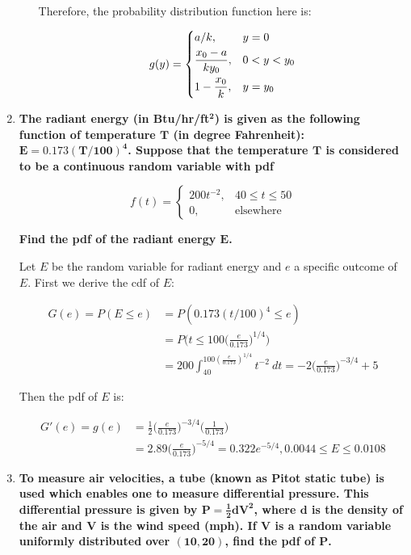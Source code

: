 \documentclass[10pt, oneside]{article}   	%
\theoremstyle{definition}
\begin{document}
\begin{enumerate}[label=5.\arabic*]
\begin{enumerate}
	Therefore, the probability distribution function here is:
	
	\[ g(y) = \begin{dcases} a/k, & y = 0 \\
	\frac{x_0 - a}{ky_0}, & 0 < y < y_0 \\
	1 - \frac{x_0}{k}, & y = y_0
	\end{dcases}
	\]
	\end{enumerate}

\item  \begin{tcolorbox}[
  colback=Cerulean!5!white,
  colframe=Cerulean!75!black]
\textbf{The radiant energy (in Btu/hr/ft$\bm{^2}$) is given as the following function of temperature $\bm{T}$ (in degree Fahrenheit): $\bm{E = 0.173 (T / 100)^4}$. Suppose that the temperature $\bm{T}$ is considered to be a continuous random variable with pdf}

\[ f(t) = \begin{cases}  200t^{-2}, & 40 \leq t \leq 50 \\
0, & \text{elsewhere} 
\end{cases} \]

\textbf{Find the pdf of the radiant energy $\bm{E}$.}
\end{tcolorbox}

Let $E$ be the random variable for radiant energy and $e$ a specific outcome of $E$. First we derive the cdf of $E$:

\begin{align*}
G(e) = P(E \leq e) &= P(0.173 (t / 100)^4 \leq e) \\
&= P \Big( t \leq 100 \Big( \frac{e}{0.173} \Big)^{1/4} \Big) \\
&= 200 \int^{100 (\frac{e}{0.173})^{1/4}}_{40} t^{-2} \ dt = - 2 \Big( \frac{e}{0.173} \Big)^{-3/4} + 5
\end{align*}

Then the pdf of $E$ is:

\begin{align*}
G'(e) = g(e) &= \frac{1}{2} \Big( \frac{e}{0.173} \Big)^{-3/4} \Big( \frac{1}{0.173} \Big) \\
&= 2.89 \Big( \frac{e}{0.173} \Big)^{-5/4} = \boxed{0.322 e^{-5/4}, 0.0044 \leq E \leq 0.0108}
\end{align*}

\item  \begin{tcolorbox}[
  colback=Cerulean!5!white,
  colframe=Cerulean!75!black]
\textbf{To measure air velocities, a tube (known as Pitot static tube) is used which enables one to measure differential pressure. This differential pressure is given by $\bm{P = \frac{1}{2} dV^2}$, where $\bm{d}$ is the density of the air and $\bm{V}$ is the wind speed (mph). If $\bm{V}$ is a random variable uniformly distributed over $\bm{(10,20)}$, find the pdf of $\bm{P}$.}
\end{tcolorbox}


\end{enumerate}
\end{document}
